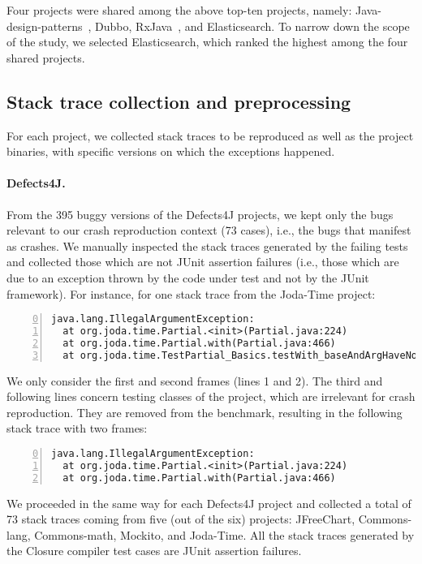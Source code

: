 Four projects were shared among the above top-ten projects, namely: Java-design-patterns~\cite{jdp}, Dubbo\cite{dubbo}, RxJava~\cite{rxjava}, and Elasticsearch.
To narrow down the scope of the study, we selected Elasticsearch, which ranked the highest among the four shared projects.


\subsection{Stack trace collection and preprocessing}

For each project, we collected stack traces to be reproduced as well as the project binaries, with specific versions on which the exceptions happened.

\paragraph{Defects4J.}
%
From the 395 buggy versions of the Defects4J projects, we kept only the bugs relevant to our crash reproduction context (73 cases), i.e., the bugs that manifest as crashes. We manually inspected the stack traces generated by the failing tests and collected those which are not JUnit assertion failures (i.e., those which are due to an exception thrown by the code under test and not by the JUnit framework).
For instance, for one stack trace from the Joda-Time project:
%
\begin{lstlisting}[basicstyle=\scriptsize\ttfamily,breaklines=true,numbers=left,firstnumber=0]
java.lang.IllegalArgumentException:
  at org.joda.time.Partial.<init>(Partial.java:224)
  at org.joda.time.Partial.with(Partial.java:466)
  at org.joda.time.TestPartial_Basics.testWith_baseAndArgHaveNoRange(...)
\end{lstlisting}
%
We only consider the first and second frames (lines 1 and 2).
The third and following lines concern testing classes of the project, which are irrelevant for crash reproduction.
They are removed from the benchmark, resulting in the following stack trace with two frames:
%
\begin{lstlisting}[basicstyle=\scriptsize\ttfamily,breaklines=true,numbers=left,firstnumber=0]
java.lang.IllegalArgumentException:
  at org.joda.time.Partial.<init>(Partial.java:224)
  at org.joda.time.Partial.with(Partial.java:466)
\end{lstlisting}
%
We proceeded in the same way for each Defects4J project and collected a total of 73 stack traces coming from five (out of the six) projects: JFreeChart, Commons-lang, Commons-math, Mockito, and Joda-Time. All the stack traces generated by the Closure compiler test cases are JUnit assertion failures.

